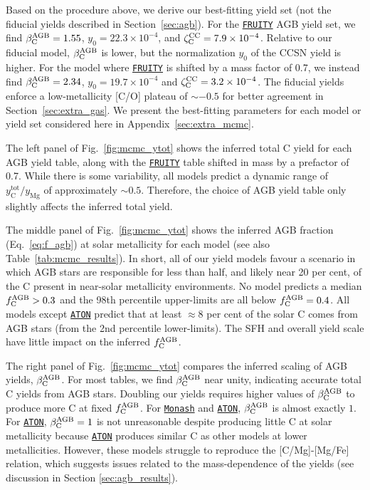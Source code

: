 \documentclass[fleqn,
usenatbib]{mnras}
\newcommand{\fruity}{\texttt{\hyperlink{fruity}{FRUITY}}}
\newcommand{\monash}{\texttt{\hyperlink{monash}{Monash}}}
\newcommand{\aton}{\texttt{\hyperlink{aton}{ATON}}}
\newcommand{\aagb}{\beta_{\rm C}^{\rm AGB}}
\newcommand{\fagb}{f_{\rm C}^{\rm AGB}}
\newcommand{\yo}{y_0}
\newcommand{\zcc}{\zeta_{\rm C}^{\rm CC}}
\newcommand{\about}[1]{${\sim} #1$}
\begin{document}
{Based on the procedure above, we derive our best-fitting yield set (not the fiducial yields described in Section~\ref{sec:agb}). For the \fruity{} AGB yield set, we find $\aagb = 1.55$, $\yo =22.3\times10^{-4}$, and $\zcc=7.9\times10^{-4}$. Relative to our fiducial model, $\aagb$ is lower, but the normalization $\yo$ of the CCSN yield is higher. For the model where \fruity{} is shifted by a mass factor of 0.7, we instead find $\aagb = 2.34$, $\yo = 19.7\times 10^{-4}$ and $\zcc=3.2\times 10^{-4}$.  The fiducial yields enforce a low-metallicity [C/O] plateau of \about{-0.5} for better agreement in Section~\ref{sec:extra_gas}. We present the best-fitting parameters for each model or yield set considered here in Appendix~\ref{sec:extra_mcmc}. 

The left panel of Fig.~\ref{fig:mcmc_ytot} shows the inferred total C yield for each AGB yield table, along with the \fruity{} table shifted in mass by a prefactor of 0.7. While there is some variability, all models predict  a dynamic range of $y_\text{C}^\text{tot} / y_\text{Mg}$ of approximately $\sim$$0.5$. Therefore, the choice of AGB yield table only slightly affects the inferred total yield.


The middle panel of Fig.~\ref{fig:mcmc_ytot} shows the inferred AGB fraction (Eq.~\ref{eq:f_agb}) at solar metallicity for each model (see also Table~\ref{tab:mcmc_results}). 
In short, all of our yield models favour a scenario in which AGB stars are responsible for less than half, and likely near 20 per cent, of the C present in near-solar metallicity environments. No model predicts a median $\fagb > 0.3$ and the 98th percentile upper-limits are all below $\fagb=0.4$. All models except \aton{} predict that at least $\approx 8$ per cent of the solar C comes from AGB stars (from the 2nd percentile lower-limits). The SFH and overall yield scale have little impact on the inferred $\fagb$.  

The right panel of Fig.~\ref{fig:mcmc_ytot} compares the inferred scaling of AGB yields, $\aagb$. For most tables, we find $\aagb$ near unity, indicating accurate total C yields from AGB stars.
Doubling our yields requires higher values of $\aagb$ to produce more C at fixed $\fagb$.
For \monash{} and \aton{}, $\aagb$ is almost exactly $1$. For \aton{}, $\aagb=1$ is not unreasonable despite producing little C at solar metallicity because \aton{} produces similar C as other models at lower metallicities. 
However, these models struggle to reproduce the [C/Mg]-[Mg/Fe] relation, which suggests issues related to the mass-dependence of the yields (see discussion in Section \ref{sec:agb_results}).


}
\end{document}
